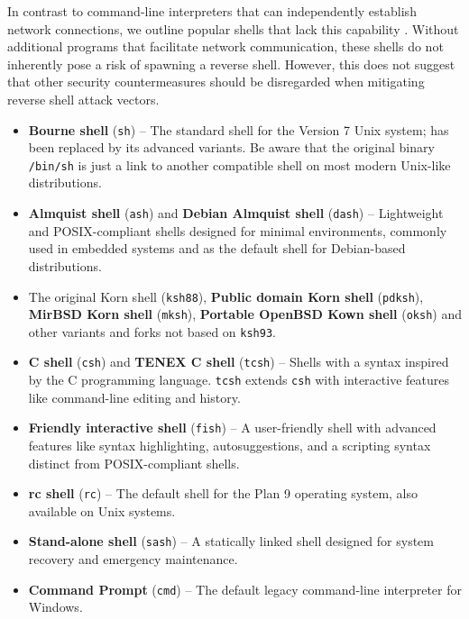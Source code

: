 In contrast to command-line interpreters that can independently establish network connections, we outline popular shells that lack this capability \cite{shell-comparison-wiki}. Without additional programs that facilitate network communication, these shells do not inherently pose a risk of spawning a reverse shell. However, this does not suggest that other security countermeasures should be disregarded when mitigating reverse shell attack vectors.

\begin{itemize}

\item \textbf{Bourne shell} (\texttt{sh}) -- The standard shell for the Version 7 Unix system; has been replaced by its advanced variants. Be aware that the original binary \texttt{/bin/sh} is just a link to another compatible shell on most modern Unix-like distributions.

\item \textbf{Almquist shell} (\texttt{ash}) and \textbf{Debian Almquist shell} (\texttt{dash}) -- Lightweight and POSIX-compliant shells designed for minimal environments, commonly used in embedded systems and as the default shell for Debian-based distributions.

\item The original Korn shell (\texttt{ksh88}), \textbf{Public domain Korn shell} (\texttt{pdksh}), \textbf{MirBSD Korn shell} (\texttt{mksh}), \textbf{Portable OpenBSD Kown shell} (\texttt{oksh}) and other variants and forks not based on \texttt{ksh93}.

\item \textbf{C shell} (\texttt{csh}) and \textbf{TENEX C shell} (\texttt{tcsh}) -- Shells with a syntax inspired by the C programming language. \texttt{tcsh} extends \texttt{csh} with interactive features like command-line editing and history.

\item \textbf{Friendly interactive shell} (\texttt{fish}) -- A user-friendly shell with advanced features like syntax highlighting, autosuggestions, and a scripting syntax distinct from POSIX-compliant shells.

\item \textbf{rc shell} (\texttt{rc}) -- The default shell for the Plan 9 operating system, also available on Unix systems.

\item \textbf{Stand-alone shell} (\texttt{sash}) -- A statically linked shell designed for system recovery and emergency maintenance.

\item \textbf{Command Prompt} (\texttt{cmd}) -- The default legacy command-line interpreter for Windows.

\end{itemize}


